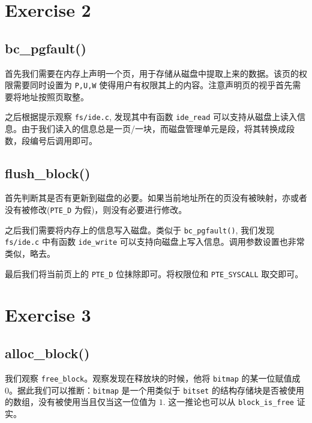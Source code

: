 \documentclass[11pt]{article}
\begin{document}
	\section{Exercise 2}
	
	\subsection*{bc\_pgfault()}
	
		\par 首先我们需要在内存上声明一个页，用于存储从磁盘中提取上来的数据。该页的权限需要同时设置为 \texttt{P,U,W} 使得用户有权限其上的内容。注意声明页的视乎首先需要将地址按照页取整。
		
		\par 之后根据提示观察 \texttt{fs/ide.c}, 发现其中有函数 \texttt{ide\_read} 可以支持从磁盘上读入信息。由于我们读入的信息总是一页/一块，而磁盘管理单元是段，将其转换成段数，段编号后调用即可。
		
	\subsection*{flush\_block()}
	
		\par 首先判断其是否有更新到磁盘的必要。如果当前地址所在的页没有被映射，亦或者没有被修改(\texttt{PTE\_D} 为假)，则没有必要进行修改。
		
		\par 之后我们需要将内存上的信息写入磁盘。类似于 \texttt{bc\_pgfault()}, 我们发现 \texttt{fs/ide.c} 中有函数 \texttt{ide\_write} 可以支持向磁盘上写入信息。调用参数设置也非常类似，略去。
		
		\par 最后我们将当前页上的 \texttt{PTE\_D} 位抹除即可。将权限位和 \texttt{PTE\_SYSCALL} 取交即可。
		
	\section{Exercise 3}
	
	\subsection*{alloc\_block()}
	
	\par 我们观察 \texttt{free\_block}。观察发现在释放块的时候，他将 \texttt{bitmap} 的某一位赋值成 0。据此我们可以推断：\texttt{bitmap} 是一个用类似于 \texttt{bitset} 的结构存储块是否被使用的数组，没有被使用当且仅当这一位值为 $1$. 这一推论也可以从 \texttt{block\_is\_free} 证实。
	
\end{document}
